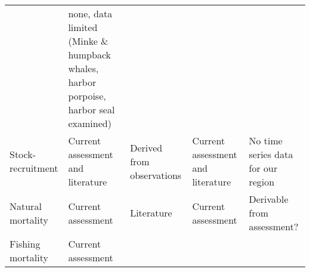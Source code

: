 \documentclass[]{article}
\begin{document}
\begin{longtable}[]{@{}lllll@{}}
\begin{minipage}[t]{0.17\columnwidth}
\end{minipage} & \begin{minipage}[t]{0.17\columnwidth}\raggedright\strut
none, data limited (Minke \& humpback whales, harbor porpoise, harbor
seal examined)\strut
\end{minipage}\tabularnewline
\begin{minipage}[t]{0.17\columnwidth}\raggedright\strut
Stock-recruitment\strut
\end{minipage} & \begin{minipage}[t]{0.17\columnwidth}\raggedright\strut
Current assessment and literature\strut
\end{minipage} & \begin{minipage}[t]{0.17\columnwidth}\raggedright\strut
Derived from observations\strut
\end{minipage} & \begin{minipage}[t]{0.17\columnwidth}\raggedright\strut
Current assessment and literature\strut
\end{minipage} & \begin{minipage}[t]{0.17\columnwidth}\raggedright\strut
No time series data for our region\strut
\end{minipage}\tabularnewline
\begin{minipage}[t]{0.17\columnwidth}\raggedright\strut
Natural mortality\strut
\end{minipage} & \begin{minipage}[t]{0.17\columnwidth}\raggedright\strut
Current assessment\strut
\end{minipage} & \begin{minipage}[t]{0.17\columnwidth}\raggedright\strut
Literature\strut
\end{minipage} & \begin{minipage}[t]{0.17\columnwidth}\raggedright\strut
Current assessment\strut
\end{minipage} & \begin{minipage}[t]{0.17\columnwidth}\raggedright\strut
Derivable from assessment?\strut
\end{minipage}\tabularnewline
\begin{minipage}[t]{0.17\columnwidth}\raggedright\strut
Fishing mortality\strut
\end{minipage} & \begin{minipage}[t]{0.17\columnwidth}\raggedright\strut
Current assessment\strut
\end{minipage} & \begin{minipage}[t]{0.17\columnwidth}\raggedright\strut

\end{minipage}
\end{longtable}
\end{document}
